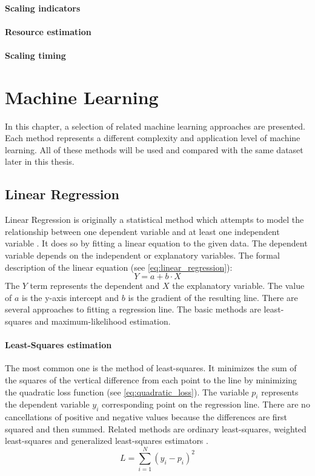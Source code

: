 \documentclass[
	english,
	ruledheaders=section,%
	class=report,%
	thesis={type=master},%
	accentcolor=8c,%
	custommargins=true,%
	marginpar=false,%
	parskip=half-,%
	fontsize=11pt,%
]{tudapub}
\begin{document}
\paragraph{Scaling indicators}

\paragraph{Resource estimation}
\paragraph{Scaling timing}

\section{Machine Learning}
In this chapter, a selection of related machine learning approaches are presented. Each method represents a different complexity and application level of machine learning. All of these methods will be used and compared with the same dataset later in this thesis.
\subsection{Linear Regression}
Linear Regression is originally a statistical method which attempts to model the relationship between one dependent variable and at least one independent variable \cite{montgomery2021introduction}. It does so by fitting a linear equation to the given data. The dependent variable depends on the independent or explanatory variables. The formal description of the linear equation (see \ref{eq:linear_regression}): 
\begin{equation}
Y = a + b \cdot X
\label{eq:linear_regression}	
\end{equation}
The $Y$ term represents the dependent and $X$ the explanatory variable. The value of $a$ is the y-axis intercept and $b$ is the gradient of the resulting line. There are several approaches to fitting a regression line. The basic methods are least-squares and maximum-likelihood estimation.
\paragraph{Least-Squares estimation}
The most common one is the method of least-squares. It minimizes the sum of the squares of the vertical difference from each point to the line by minimizing the quadratic loss function (see \ref{eq:quadratic_loss}). The variable $p_i$ represents the dependent variable $y_i$ corresponding point on the regression line. There are no cancellations of positive and negative values because the differences are first squared and then summed. Related methods are ordinary least-squares, weighted least-squares and generalized least-squares estimators \cite{montgomery2021introduction}.
\begin{equation}
	L = \sum_{i=1}^{N} (y_i - p_i)^2
	\label{eq:quadratic_loss}
\end{equation}
\end{document}
